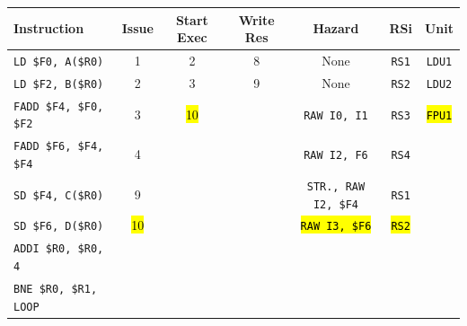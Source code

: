 \begin{enumerate}
    \begin{table}[!htp]
        \centering
        \begin{adjustbox}{width={\textwidth},totalheight={\textheight},keepaspectratio}
        \begin{tabular}{@{} l c c c c c c @{}}
            \toprule
            \textbf{Instruction} & \textbf{Issue} & \textbf{Start Exec} & \textbf{Write Res} & \textbf{Hazard} & \textbf{RSi} & \textbf{Unit} \\
            \midrule
            \texttt{LD \$F0, A(\$R0)}       & 1 & 2 & 8 & None  & \texttt{RS1}   & \texttt{LDU1}  \\ [.5em]
            \texttt{LD \$F2, B(\$R0)}       & 2 & 3 & 9 & None  & \texttt{RS2}   & \texttt{LDU2}  \\ [.5em]
            \texttt{FADD \$F4, \$F0, \$F2}  & 3 & \hl{10} &   & \texttt{RAW I0, I1} & \texttt{RS3} & \hl{\texttt{FPU1}} \\ [.5em]
            \texttt{FADD \$F6, \$F4, \$F4}  & 4 &   &   & \texttt{RAW I2, F6} & \texttt{RS4} & \\ [.5em]
            \texttt{SD \$F4, C(\$R0)}       & 9 &   &   & \texttt{STR., RAW I2, \$F4} & \texttt{RS1} & \\ [.5em]
            \texttt{SD \$F6, D(\$R0)}       & \hl{10} &   &   & \hl{\texttt{RAW I3, \$F6}} & \hl{\texttt{RS2}} &       \\ [.5em]
            \texttt{ADDI \$R0, \$R0, 4}     &   &   &   &       &       &       \\ [.5em]
            \texttt{BNE \$R0, \$R1, LOOP}   &   &   &   &       &       &       \\
            \bottomrule
        \end{tabular}
        \end{adjustbox}
    \end{table}
    

\end{enumerate}

